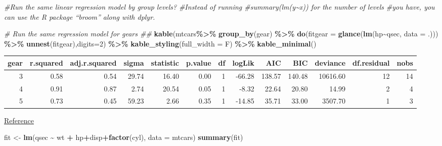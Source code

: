 \documentclass[
]{article}
\newenvironment{Shaded}{\begin{snugshade}}{\end{snugshade}}
\newcommand{\AttributeTok}[1]{\textcolor[rgb]{0.13,0.29,0.53}{#1}}
\newcommand{\CommentTok}[1]{\textcolor[rgb]{0.56,0.35,0.01}{\textit{#1}}}
\newcommand{\DecValTok}[1]{\textcolor[rgb]{0.00,0.00,0.81}{#1}}
\newcommand{\FunctionTok}[1]{\textcolor[rgb]{0.13,0.29,0.53}{\textbf{#1}}}
\newcommand{\NormalTok}[1]{#1}
\newcommand{\OtherTok}[1]{\textcolor[rgb]{0.56,0.35,0.01}{#1}}
\newcommand{\SpecialCharTok}[1]{\textcolor[rgb]{0.81,0.36,0.00}{\textbf{#1}}}
\begin{document}
\begin{Shaded}
\begin{Highlighting}[]
\CommentTok{\#Run the same linear regression model by group levels? }
\CommentTok{\#Instead of running \#summary(lm(y\textasciitilde{}x)) for the number of levels }
\CommentTok{\#you have, you can use the R package “broom” along with dplyr.}

\CommentTok{\# Run the same regression model for gears \#\#}
\FunctionTok{kable}\NormalTok{(mtcars}\SpecialCharTok{\%\textgreater{}\%} \FunctionTok{group\_by}\NormalTok{(gear) }\SpecialCharTok{\%\textgreater{}\%}
  \FunctionTok{do}\NormalTok{(}\AttributeTok{fitgear =} \FunctionTok{glance}\NormalTok{(}\FunctionTok{lm}\NormalTok{(hp}\SpecialCharTok{\textasciitilde{}}\NormalTok{qsec, }\AttributeTok{data =}\NormalTok{ .))) }\SpecialCharTok{\%\textgreater{}\%} 
  \FunctionTok{unnest}\NormalTok{(fitgear),}\AttributeTok{digits=}\DecValTok{2}\NormalTok{) }\SpecialCharTok{\%\textgreater{}\%}   \FunctionTok{kable\_styling}\NormalTok{(}\AttributeTok{full\_width =}\NormalTok{ F) }\SpecialCharTok{\%\textgreater{}\%} 
  \FunctionTok{kable\_minimal}\NormalTok{()}
\end{Highlighting}
\end{Shaded}

\begin{table}
\centering
\begin{tabular}{r|r|r|r|r|r|r|r|r|r|r|r|r}
\hline
gear & r.squared & adj.r.squared & sigma & statistic & p.value & df & logLik & AIC & BIC & deviance & df.residual & nobs\\
\hline
3 & 0.58 & 0.54 & 29.74 & 16.40 & 0.00 & 1 & -66.28 & 138.57 & 140.48 & 10616.60 & 12 & 14\\
\hline
4 & 0.91 & 0.87 & 2.74 & 20.54 & 0.05 & 1 & -8.32 & 22.64 & 20.80 & 14.99 & 2 & 4\\
\hline
5 & 0.73 & 0.45 & 59.23 & 2.66 & 0.35 & 1 & -14.85 & 35.71 & 33.00 & 3507.70 & 1 & 3\\
\hline
\end{tabular}
\end{table}

\href{https://stackoverflow.com/questions/22713325/fitting-several-regression-models-with-dplyr}{Reference}

\begin{Shaded}
\begin{Highlighting}[]
\NormalTok{fit }\OtherTok{\textless{}{-}} \FunctionTok{lm}\NormalTok{(qsec }\SpecialCharTok{\textasciitilde{}}\NormalTok{ wt }\SpecialCharTok{+}\NormalTok{ hp}\SpecialCharTok{+}\NormalTok{disp}\SpecialCharTok{+}\FunctionTok{factor}\NormalTok{(cyl), }\AttributeTok{data =}\NormalTok{ mtcars)}
\FunctionTok{summary}\NormalTok{(fit)}
\end{Highlighting}
\end{Shaded}
\end{document}
